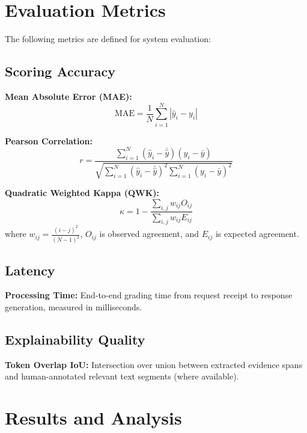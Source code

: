 \documentclass[conference]{IEEEtran}
\begin{document}
\section{Evaluation Metrics}
The following metrics are defined for system evaluation:

\subsection{Scoring Accuracy}
\textbf{Mean Absolute Error (MAE):}
\begin{equation}
    \text{MAE} = \frac{1}{N} \sum_{i=1}^{N} |\hat{y}_i - y_i|
\end{equation}

\textbf{Pearson Correlation:}
\begin{equation}
    r = \frac{\sum_{i=1}^{N}(\hat{y}_i - \bar{\hat{y}})(y_i - \bar{y})}{\sqrt{\sum_{i=1}^{N}(\hat{y}_i - \bar{\hat{y}})^2 \sum_{i=1}^{N}(y_i - \bar{y})^2}}
\end{equation}

\textbf{Quadratic Weighted Kappa (QWK):}
\begin{equation}
    \kappa = 1 - \frac{\sum_{i,j} w_{ij} O_{ij}}{\sum_{i,j} w_{ij} E_{ij}}
\end{equation}
where $w_{ij} = \frac{(i-j)^2}{(N-1)^2}$, $O_{ij}$ is observed agreement, and $E_{ij}$ is expected agreement.

\subsection{Latency}
\textbf{Processing Time:} End-to-end grading time from request receipt to response generation, measured in milliseconds.

\subsection{Explainability Quality}
\textbf{Token Overlap IoU:} Intersection over union between extracted evidence spans and human-annotated relevant text segments (where available).

\section{Results and Analysis}
\end{document}

